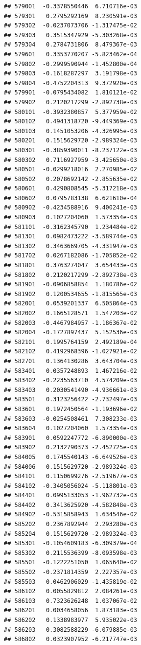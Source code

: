 \begin{frame}[fragile]
\begin{verbatim}
## 579001  -0.3378550446  6.710716e-03
## 579301   0.2795292169  8.230591e-03
## 579302  -0.0237073706 -1.317475e-02
## 579303   0.3515347929 -5.303268e-03
## 579304   0.2784731806  8.479367e-03
## 579601   0.3353770207 -5.823462e-04
## 579802  -0.2999590944 -1.452800e-04
## 579803  -0.1618287297  3.191798e-03
## 579804  -0.4752204313  9.372920e-03
## 579901  -0.0795434082  1.810121e-02
## 579902   0.2120217299 -2.892738e-03
## 580101  -0.3932380857  5.377959e-02
## 580102   0.4941318720 -9.449369e-03
## 580103   0.1451053206 -4.326995e-03
## 580201   0.1515629720 -2.989324e-03
## 580301  -0.3859390011 -8.237122e-03
## 580302   0.7116927959 -3.425650e-03
## 580501  -0.0299218016  2.270985e-02
## 580502   0.2078692142 -2.855635e-02
## 580601   0.4290808545 -5.317218e-03
## 580602   0.0795783138  6.621610e-04
## 580902  -0.4234588916  9.400241e-03
## 580903   0.1027204060  1.573354e-03
## 581101  -0.3162345790  1.234484e-02
## 581301   0.0982473222 -3.589744e-03
## 581302   0.3463669705 -4.331947e-03
## 581702   0.0267182086 -1.705852e-02
## 581801   0.3763274047  3.654433e-03
## 581802   0.2120217299 -2.892738e-03
## 581901  -0.0906858854  1.180786e-02
## 581902   0.1200534655 -1.815565e-03
## 582001   0.0539201337  6.505864e-03
## 582002   0.1665128571  1.547203e-02
## 582003  -0.4467984957 -1.186367e-02
## 582004  -0.1727897437  5.152536e-03
## 582101   0.1995764159  2.492189e-04
## 582102   0.4192968396 -1.027921e-02
## 582701   0.1364130286  3.643704e-03
## 583401   0.0357248893  1.467216e-02
## 583402  -0.2235563710  4.574209e-03
## 583403   0.2030541490 -4.936661e-03
## 583501   0.3123256422 -2.732497e-03
## 583601   0.1972450564 -1.193696e-02
## 583603  -0.0254508461  7.308233e-03
## 583604   0.1027204060  1.573354e-03
## 583901   0.0592247772 -6.890000e-03
## 583902   0.2132790373 -2.452725e-03
## 584005   0.1745540143 -6.649526e-03
## 584006   0.1515629720 -2.989324e-03
## 584101   0.1150699276 -2.519677e-03
## 584102  -0.3405056024 -5.118801e-03
## 584401   0.0995133053 -1.962732e-03
## 584402   0.3413625920 -4.582848e-03
## 584902  -0.5315858943  1.634546e-02
## 585202   0.2367892944  2.293280e-03
## 585204   0.1515629720 -2.989324e-03
## 585301  -0.1054609183 -6.309379e-04
## 585302   0.2115536399 -8.093598e-03
## 585501  -0.1222251050  1.065640e-02
## 585502  -0.2371814359  2.227357e-03
## 585503   0.0462906029 -1.435819e-02
## 586102   0.0055829812  2.084261e-03
## 586103   0.7323626248  1.037067e-02
## 586201   0.0034658056  1.873183e-03
## 586202   0.1338983977  5.935022e-03
## 586203   0.3082588229 -6.079885e-03
## 586802   0.0323907952 -6.217747e-03

\end{verbatim}
\end{frame}
